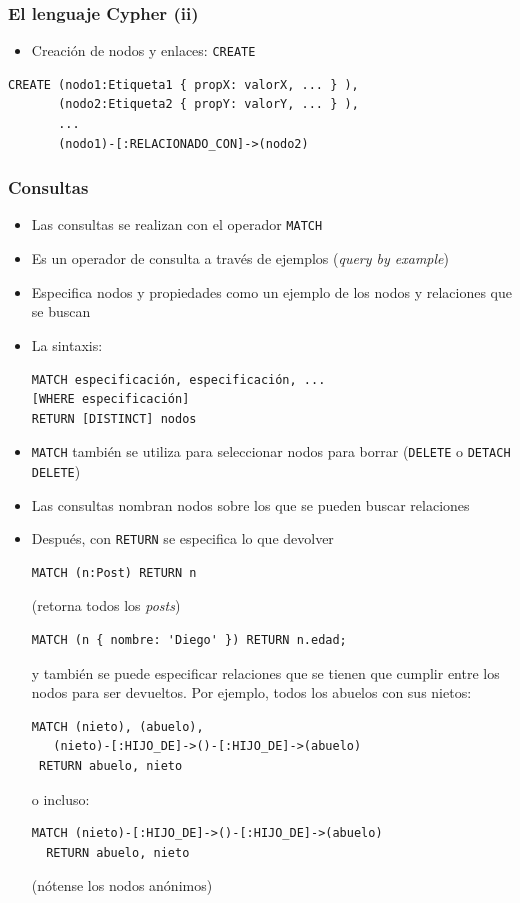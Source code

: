\documentclass[14pt]{beamer}
\begin{document}
\begin{frame}[fragile]
  \frametitle{El lenguaje Cypher (ii)}
  \begin{itemize}
  \item Creación de nodos y enlaces: {\tt CREATE}
  \end{itemize}

\begin{lstlisting}[language=cypher]
CREATE (nodo1:Etiqueta1 { propX: valorX, ... } ),
       (nodo2:Etiqueta2 { propY: valorY, ... } ),
       ...
       (nodo1)-[:RELACIONADO_CON]->(nodo2)
\end{lstlisting}
\end{frame}

\begin{frame}
  \frametitle{Consultas}
  \begin{itemize}
  \item Las consultas se realizan con el operador {\tt MATCH}
  \item Es un operador de consulta a través de ejemplos ({\em query by
      example})
\item Especifica nodos y propiedades como un ejemplo de los nodos y
  relaciones que se buscan
\item La sintaxis:

\begin{lstlisting}[language=cypher]
MATCH especificación, especificación, ...
[WHERE especificación]
RETURN [DISTINCT] nodos
\end{lstlisting}

\item {\tt MATCH} también se utiliza para seleccionar nodos para borrar
  ({\tt DELETE} o {\tt DETACH DELETE})

  \item Las consultas nombran nodos sobre los que se pueden buscar
    relaciones
\item Después, con {\tt RETURN} se especifica lo que devolver
\begin{lstlisting}[language=cypher]
MATCH (n:Post) RETURN n
\end{lstlisting}
(retorna todos los {\em posts})

\begin{lstlisting}[language=cypher]
MATCH (n { nombre: 'Diego' }) RETURN n.edad;
\end{lstlisting}

y también se puede especificar relaciones que se tienen que cumplir entre
los nodos para ser devueltos. Por ejemplo, todos los abuelos con sus
nietos:

\begin{lstlisting}[language=cypher]
MATCH (nieto), (abuelo),
   (nieto)-[:HIJO_DE]->()-[:HIJO_DE]->(abuelo)
 RETURN abuelo, nieto
\end{lstlisting}
o incluso:
\begin{lstlisting}[language=cypher]
MATCH (nieto)-[:HIJO_DE]->()-[:HIJO_DE]->(abuelo)
  RETURN abuelo, nieto
\end{lstlisting}

(nótense los nodos anónimos)
  \end{itemize}
\end{frame}
\end{document}
